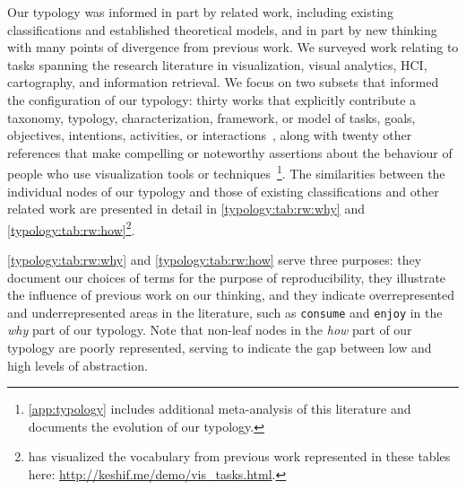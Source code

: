 Our typology was informed in part by related work, including existing classifications and established theoretical models, and in part by new thinking with many points of divergence from previous work.
We surveyed work relating to tasks spanning the research literature in visualization, visual analytics, \ac{HCI}, cartography, and information retrieval.
We focus on two subsets that informed the configuration of our typology: thirty works that explicitly contribute a taxonomy, typology, characterization, framework, or model of tasks, goals, objectives, intentions, activities, or interactions~\cite{Amar2005,Amar2004,Andrienko2006,Buja1996,Card1999,Casner1991,Chi1998,Chuah1996,Dix1998,Gotz2008,Heer2012,Keim2002,Klein2006,Lee2006,Liu2010,Mullins1993,Pike2009,Pirolli2005,Raskin2000,Roth2012,Roth2013,Roth1990,Shneiderman1996,Spence2007,Springmeyer1992,Tweedie1997,Valiati2006,Ward2004,Wehrend1990,Yi2007,Zhou1998}, along with twenty other references that make compelling or noteworthy assertions about the behaviour of people who use visualization tools or techniques~\cite{Aigner2011,Andre2009,Dork2011,Dork2012,Friel2001,Kandel2012,Marchionini2006,Munzner2009a,Plaisant1995,Pousman2007,Roth2012a,Sprague2012,Shrinivasan2008,Stephenson1967,Tory2004,Toms2000,Tukey1977,vanWijk2006,Ware2012,Wilkinson2005}\footnote{\autoref{app:typology} includes additional meta-analysis of this literature and documents the evolution of our typology.}.
The similarities between the individual nodes of our typology and those of existing classifications and other related work are presented in detail in \autoref{typology:tab:rw:why} and \autoref{typology:tab:rw:how}\footnote{\citet{Yalcin2014} has visualized the vocabulary from previous work represented in these tables here: \url{http://keshif.me/demo/vis_tasks.html}.}.

\autoref{typology:tab:rw:why} and \autoref{typology:tab:rw:how} serve three purposes: they document our choices of terms for the purpose of reproducibility, they illustrate the influence of previous work on our thinking, and they indicate overrepresented and underrepresented areas in the literature, such as {\tt consume} and {\tt enjoy} in the {\it why} part of our typology.
Note that non-leaf nodes in the {\it how} part of our typology are poorly represented, serving to indicate the gap between low and high levels of abstraction.

